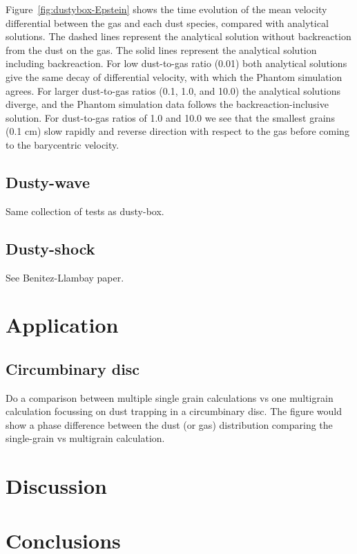 \documentclass[fleqn,usenatbib]{mnras}
\begin{document}
Figure~\ref{fig:dustybox-Epstein} shows the time evolution of the mean velocity
differential between the gas and each dust species, compared with analytical
solutions. The dashed lines represent the analytical solution without
backreaction from the dust on the gas. The solid lines represent the analytical
solution including backreaction. For low dust-to-gas ratio (0.01) both
analytical solutions give the same decay of differential velocity, with which
the Phantom simulation agrees. For larger dust-to-gas ratios (0.1, 1.0, and
10.0) the analytical solutions diverge, and the Phantom simulation data follows
the backreaction-inclusive solution. For dust-to-gas ratios of 1.0 and 10.0 we
see that the smallest grains (0.1 cm) slow rapidly and reverse direction with
respect to the gas before coming to the barycentric velocity.

\subsection{Dusty-wave}

Same collection of tests as dusty-box.

\subsection{Dusty-shock}
See Benitez-Llambay paper.

\section{Application}

\subsection{Circumbinary disc}

Do a comparison between multiple single grain calculations vs one multigrain
calculation focussing on dust trapping in a circumbinary disc. The figure would
show a phase difference between the dust (or gas) distribution comparing the
single-grain vs multigrain calculation.

\section{Discussion}

\section{Conclusions}
\end{document}
